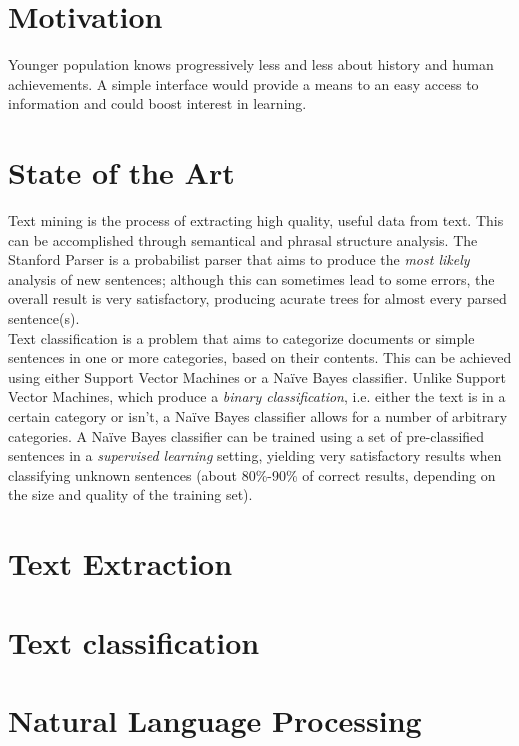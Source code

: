 \documentclass{llncs}
\begin{document}
\section{Motivation}

Younger population knows progressively less and less about history and human achievements. A simple interface would provide a means to an easy access to information and could boost interest in learning.\\

\section{State of the Art}

Text mining is the process of extracting high quality, useful data from text. This can be accomplished through semantical and phrasal structure analysis. The Stanford Parser is a probabilist parser that aims to produce the \textit{most likely} analysis of new sentences; although this can sometimes lead to some errors, the overall result is very satisfactory, producing acurate trees for almost every parsed sentence(s).\\

Text classification is a problem that aims to categorize documents or simple sentences in one or more categories, based on their contents. This can be achieved using either Support Vector Machines or a Naïve Bayes classifier. Unlike Support Vector Machines, which produce a \textit{binary classification}, i.e. either the text is in a certain category or isn't, a Naïve Bayes classifier allows for a number of arbitrary categories. A Naïve Bayes classifier can be trained using a set of pre-classified sentences in a \textit{supervised learning} setting, yielding very satisfactory results when classifying unknown sentences (about 80\%-90\% of correct results, depending on the size and quality of the training set).

\section{Text Extraction}

\section{Text classification}

\section{Natural Language Processing}
\end{document}
